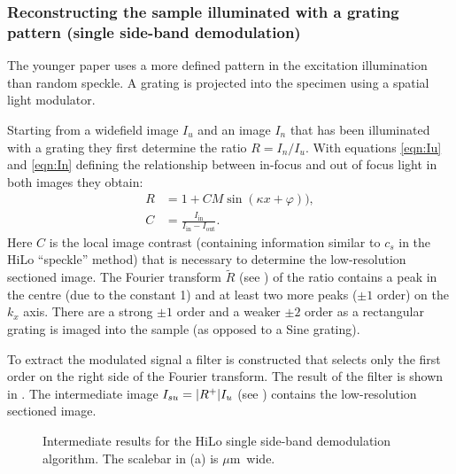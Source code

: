 \subsubsection{Reconstructing the sample illuminated with a grating
  pattern (single side-band demodulation)}
The younger paper \cite{2009Santos} uses a more defined pattern in the
excitation illumination than random speckle. A grating is projected
into the specimen using a spatial light modulator.

Starting from a widefield image $I_u$ and an image $I_n$ that has been
illuminated with a grating they first determine the ratio $R=I_n/I_u$.
With equations \eqref{eqn:Iu} and \eqref{eqn:In} defining the
relationship between in-focus and out of focus light in both images
they obtain:
\begin{align}
  R&=1+CM\sin(\kappa x+\varphi)),\\
  C&=\frac{I_\textrm{in}}{I_\textrm{in}-I_\textrm{out}}.
\end{align}
Here $C$ is the local image contrast (containing information similar
to $c_s$ in the HiLo ``speckle'' method) that is necessary to
determine the low-resolution sectioned image. The Fourier transform
$\tilde R$ (see ) of the ratio contains a peak in the
centre (due to the constant 1) and at least two more peaks ($\pm 1$
order) on the $k_x$ axis. There are a strong $\pm 1$ order and a
weaker $\pm 2$ order as a rectangular grating is imaged into the
sample (as opposed to a Sine grating).

To extract the modulated signal a filter is constructed that selects
only the first order on the right side of the Fourier transform. The
result of the filter is shown in . The intermediate
image $I_{su}=\mathopen| R^+ \mathclose|I_u$ (see ) contains the
low-resolution sectioned image.

\begin{figure}[htb]
  \centering {}
  \caption{Intermediate results for the HiLo single side-band
    demodulation algorithm. The scalebar in (a) is \unit[2]{$\mu$m}
    wide.}
  \label{fig:hilo2}
\end{figure}

